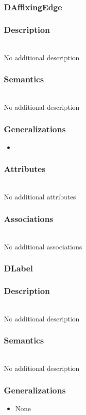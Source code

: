 \documentclass{article}
\begin{document}
\subsubsection{DAffixingEdge}\label{DAffixingEdge} 
\subsubsection*{Description} ~\\ No additional description
\subsubsection*{Semantics} ~\\ No additional description
\subsubsection*{Generalizations}
\begin{itemize}
\item {}
\end{itemize}
\subsubsection*{Attributes} ~\\ No additional attributes
\subsubsection*{Associations} ~\\ No additional associations
\subsubsection{DLabel}\label{DLabel} 
\subsubsection*{Description} ~\\ No additional description
\subsubsection*{Semantics} ~\\ No additional description
\subsubsection*{Generalizations}
\begin{itemize}
\item None
\end{itemize}
\end{document}
